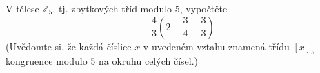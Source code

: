 \subsubsection{}
V tělese $\mathbb{Z}_{5}$, tj. zbytkových tříd modulo 5, vypočtěte
$$-\frac{4}{3}\left ( 2-\frac{3}{4} -\frac{3}{3}\right )$$
(Uvědomte si, že každá číslice $x$ v uvedeném vztahu znamená třídu $\left [ x
\right ]_{5}$ kongruence modulo 5 na okruhu celých čísel.)
